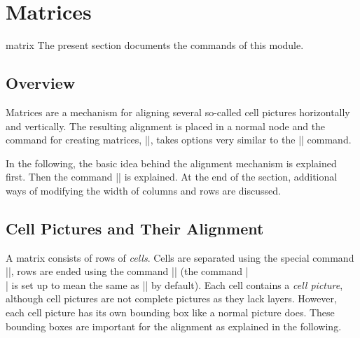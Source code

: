 %
%
%


\section[base-matrices]{Matrices}
\label{section-base-matrices}

\begin{pgfmodule}{matrix}
The present section documents the commands of this module.
\end{pgfmodule}

\subsection{Overview}

Matrices are a mechanism for aligning several so-called cell pictures
horizontally and vertically. The resulting alignment is placed in a normal node
and the command for creating matrices, |\pgfmatrix|, takes options very similar
to the |\pgfnode| command.

In the following, the basic idea behind the alignment mechanism is explained
first. Then the command |\pgfmatrix| is explained. At the end of the section,
additional ways of modifying the width of columns and rows are discussed.


\subsection{Cell Pictures and Their Alignment}

A matrix consists of rows of \emph{cells}. Cells are separated using the
special command |\pgfmatrixnextcell|, rows are ended using the command
|\pgfmatrixendrow| (the command |\\| is set up to mean the same as
|\pgfmatrixendrow| by default). Each cell contains a \emph{cell picture},
although cell pictures are not complete pictures as they lack layers. However,
each cell picture has its own bounding box like a normal picture does. These
bounding boxes are important for the alignment as explained in the following.

